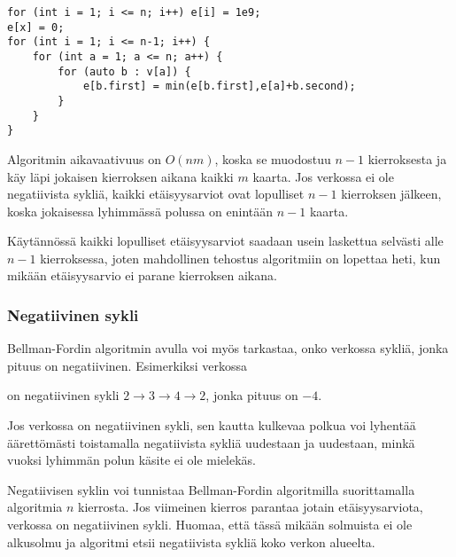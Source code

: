 \begin{lstlisting}
for (int i = 1; i <= n; i++) e[i] = 1e9;
e[x] = 0;
for (int i = 1; i <= n-1; i++) {
    for (int a = 1; a <= n; a++) {
        for (auto b : v[a]) {
            e[b.first] = min(e[b.first],e[a]+b.second);
        }
    }
}
\end{lstlisting}

Algoritmin aikavaativuus on $O(nm)$,
koska se muodostuu $n-1$ kierroksesta ja
käy läpi jokaisen kierroksen aikana kaikki $m$ kaarta.
Jos verkossa ei ole negatiivista sykliä,
kaikki etäisyysarviot ovat lopulliset $n-1$
kierroksen jälkeen, koska jokaisessa lyhimmässä
polussa on enintään $n-1$ kaarta.

Käytännössä kaikki lopulliset etäisyysarviot
saadaan usein laskettua selvästi alle $n-1$ kierroksessa,
joten mahdollinen tehostus algoritmiin on lopettaa heti,
kun mikään etäisyysarvio ei parane kierroksen aikana.

\subsubsection{Negatiivinen sykli}

Bellman-Fordin algoritmin avulla voi myös tarkastaa,
onko verkossa sykliä,
jonka pituus on negatiivinen.
Esimerkiksi verkossa

\begin{center}
\end{center}
\noindent
on negatiivinen sykli $2 \rightarrow 3 \rightarrow 4 \rightarrow 2$,
jonka pituus on $-4$.

Jos verkossa on negatiivinen sykli,
sen kautta kulkevaa polkua voi lyhentää äärettömästi
toistamalla negatiivista sykliä uudestaan ja uudestaan,
minkä vuoksi lyhimmän polun käsite ei ole mielekäs.

Negatiivisen syklin voi tunnistaa
Bellman-Fordin algoritmilla
suorittamalla algoritmia $n$ kierrosta.
Jos viimeinen kierros parantaa jotain
etäisyysarviota, verkossa on negatiivinen sykli.
Huomaa, että tässä mikään solmuista ei ole alkusolmu
ja algoritmi etsii negatiivista sykliä koko verkon alueelta.

